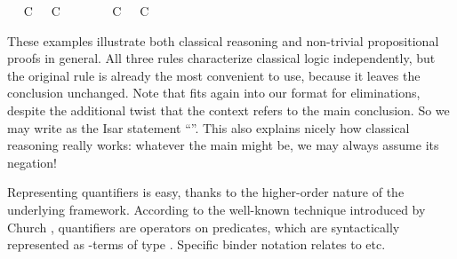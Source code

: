 \begin{isabellebody}
\ \isamarkupfalse%
\ {\isachardoublequoteopen}C\ {\isasymor}\ {\isasymnot}\ C{\isachardoublequoteclose}\ \isacommand{{\isachardot}{\isachardot}}\isamarkupfalse%
\isanewline
\ \ \ \ \isamarkupfalse%
\ {\isacharbackquoteopen}{\isasymnot}\ {\isacharparenleft}C\ {\isasymor}\ {\isasymnot}\ C{\isacharparenright}{\isacharbackquoteclose}\ \isamarkupfalse%
\ {\isasymbottom}\ \isacommand{{\isachardot}{\isachardot}}\isamarkupfalse%
\isanewline
\ \ \isamarkupfalse%
\isanewline
{}\isamarkupfalse%
%
\endisatagproof
{\isafoldproof}%
%
\isadelimproof
%
\endisadelimproof
%
\begin{isamarkuptext}%
These examples illustrate both classical reasoning and non-trivial
  propositional proofs in general.  All three rules characterize
  classical logic independently, but the original rule is already the
  most convenient to use, because it leaves the conclusion unchanged.
  Note that  fits again into our format for
  eliminations, despite the additional twist that the context refers
  to the main conclusion.  So we may write  as the
  Isar statement ``''.  This also
  explains nicely how classical reasoning really works: whatever the
  main  might be, we may always assume its negation!%
\end{isamarkuptext}%
\isamarkuptrue%
\isamarkupfalse%
%
\isamarkuptrue%
%
\begin{isamarkuptext}%
Representing quantifiers is easy, thanks to the higher-order nature
  of the underlying framework.  According to the well-known technique
  introduced by Church \cite{church40}, quantifiers are operators on
  predicates, which are syntactically represented as \isa{{\isachardoublequote}{\isasymlambda}{\isachardoublequote}}-terms
  of type .  Specific binder notation relates  to  etc.%
\end{isamarkuptext}%
\isamarkuptrue%
\isamarkupfalse%

\end{isabellebody}
